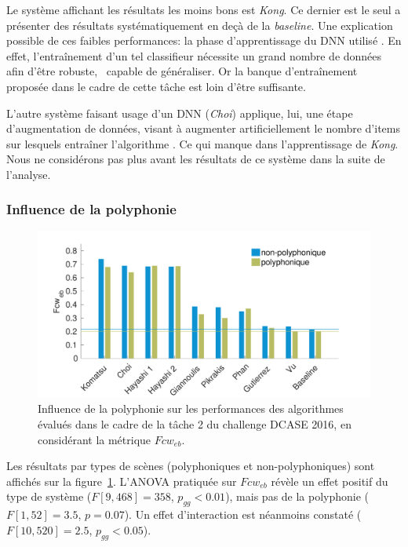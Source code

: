 Le système affichant les résultats les moins bons est \emph{Kong}. Ce dernier est le seul a présenter des résultats systématiquement en deçà de la \emph{baseline}. Une explication possible de ces faibles performances: la phase d'apprentissage du DNN utilisé \citep{Kong2016}. En effet, l’entraînement d'un tel classifieur nécessite un grand nombre de données afin d'être robuste, \ie~capable de généraliser. Or la banque d'entraînement proposée dans le cadre de cette tâche est loin d'être suffisante. 

L'autre système faisant usage d'un DNN (\emph{Choi}) applique, lui, une étape d'augmentation de données, visant à augmenter artificiellement le nombre d'items sur lesquels entraîner l'algorithme \citep{Choi2016}. Ce qui manque dans l'apprentissage de \emph{Kong}. Nous ne considérons pas plus avant les résultats de ce système dans la suite de l'analyse.

\subsubsection{Influence de la polyphonie}

\begin{figure}[t]
\includegraphics[width=1\textwidth]{gfx/ch_7/results_overall_poly_eb_class_wise_average_F_7}
\caption{Influence de la polyphonie sur les performances des algorithmes évalués dans le cadre de la tâche 2 du challenge DCASE 2016, en considérant la métrique $Fcw_{eb}$.}
\label{fig:overall_poly_eb_class_wise_F}
\end{figure}

Les résultats par types de scènes (polyphoniques et non-polyphoniques) sont affichés sur la figure~\ref{fig:overall_poly_eb_class_wise_F}. L'ANOVA pratiquée sur $Fcw_{eb}$ révèle un effet positif du type de système ($F[9,468]=358$, $p_{gg}<0.01$), mais pas de la polyphonie ($F[1,52]=3.5$, $p=0.07$). Un effet d'interaction est néanmoins constaté ($F[10,520]=2.5$, $p_{gg}<0.05$).

